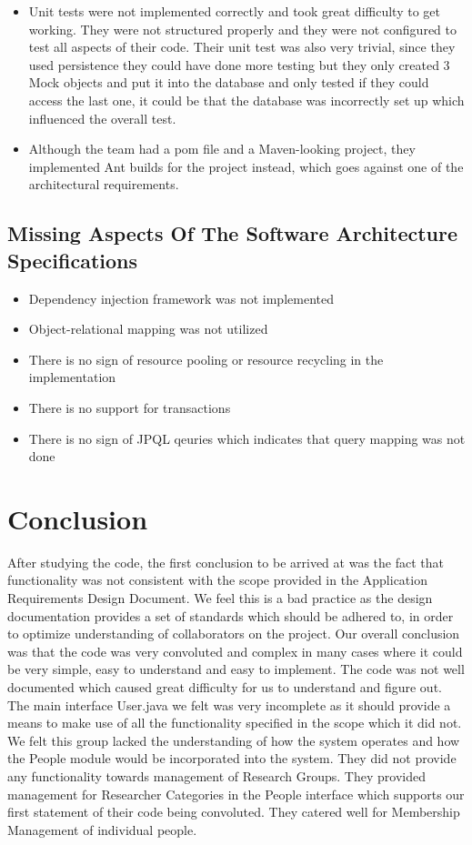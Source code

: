 \documentclass{article}
\begin{document}
	\begin{itemize}

		\item Unit tests were not implemented correctly and took great difficulty to get working. They were not structured properly and they were not configured to test all aspects of their code. Their unit test was also very trivial, since they used persistence they could have done more testing but they only created 3 Mock objects and put it into the database and only tested if they could access the last one, it could be that the database was incorrectly set up which influenced the overall test.
		\item Although the team had a pom file and a Maven-looking project, they implemented Ant builds for the project instead, which goes against one of the architectural requirements.
	\end{itemize}

	\subsection{Missing Aspects Of The Software Architecture Specifications}
	\begin{itemize}
		\item Dependency injection framework was not implemented
		\item Object-relational mapping was not utilized
		\item There is no sign of resource pooling or resource recycling in the implementation
		\item There is no support for transactions
		\item There is no sign of JPQL qeuries which indicates that query mapping was not done
	\end{itemize}
	

\section{Conclusion}
After studying the code, the first conclusion to be arrived at was the fact that functionality was not consistent with the scope provided in the Application Requirements Design Document. We feel this is a bad practice as the design documentation provides a set of standards which should be adhered to, in order to optimize understanding of collaborators on the project.  Our overall conclusion was that the code was very convoluted and complex in many cases where it could be very simple, easy to understand and easy to implement. The code was not well documented which caused great difficulty for us to understand and figure out. The main interface User.java we felt was very incomplete as it should provide a means to make use of all the functionality specified in the scope which it did not. We felt this group lacked the understanding of how the system operates and how the People module would be incorporated into the system. They did not provide any functionality towards management of Research Groups. They provided management for Researcher Categories in the People interface which supports our first statement of their code being convoluted. They catered well for Membership Management of individual people.
\end{document}
